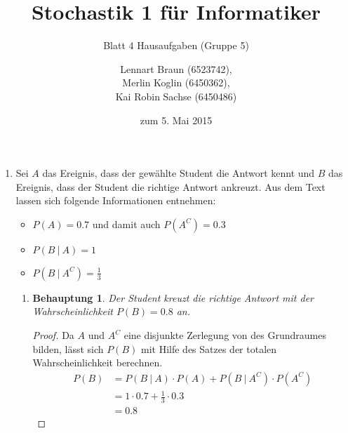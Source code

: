 \documentclass[a4paper]{scrartcl}
\title{Stochastik 1 für Informatiker}
\subtitle{Blatt 4 Hausaufgaben (Gruppe 5)}
\author{
    Lennart Braun (6523742), \\
    Merlin Koglin (6450362), \\
    Kai Robin Sachse (6450486)
}
\date{zum 5. Mai 2015}
\newtheorem*{behaupt}{Behauptung}
\begin{document}
\maketitle

\begin{enumerate}[label=\bfseries\arabic*.]
    \item
        Sei $A$ das Ereignis, dass der gewählte Student die Antwort kennt und
        $B$ das Ereignis, dass der Student die richtige Antwort ankreuzt.
        Aus dem Text lassen sich folgende Informationen entnehmen:
        \begin{itemize}
            \item $P(A) = \num{0.7}$ und damit auch $P(A^C) = \num{0.3}$
            \item $P(B\ |\ A) = 1$
            \item $P(B\ |\ A^C) = \frac{1}{3}$
        \end{itemize}
        \begin{enumerate}[label=(\alph*)]
            \item
                \begin{behaupt}
                    Der Student kreuzt die richtige Antwort mit der
                    Wahrscheinlichkeit $P(B) = \num{0.8}$ an.
                \end{behaupt}
                \begin{proof}
                    Da $A$ und $A^C$ eine disjunkte Zerlegung von des
                    Grundraumes bilden, lässt sich $P(B)$ mit Hilfe des Satzes
                    der totalen Wahrscheinlichkeit berechnen.
                    \begin{equation*}
                        \begin{split}
                            P(B) &= P(B\ |\ A) \cdot P(A)
                                    + P(B\ |\ A^C) \cdot P(A^C) \\
                                 &= 1 \cdot \num{0.7}
                                    + \frac{1}{3} \cdot \num{0.3} \\
                                 &= \num{0.8}
                        \end{split}
                    \end{equation*}
                \end{proof}


\end{enumerate}
\end{enumerate}
\end{document}
